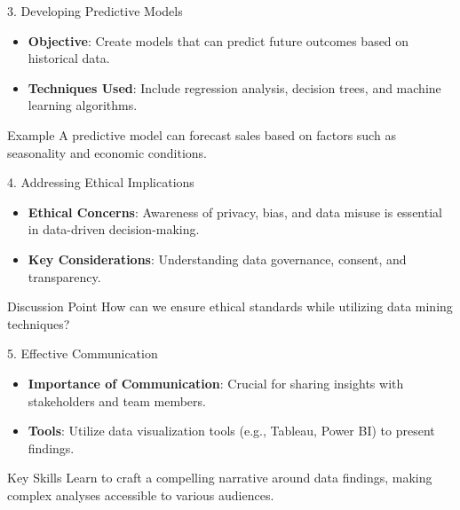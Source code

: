 \documentclass[aspectratio=169]{beamer}
\begin{document}
\begin{frame}[fragile]{3. Developing Predictive Models}
    \begin{itemize}
        \item \textbf{Objective}: Create models that can predict future outcomes based on historical data.
        \item \textbf{Techniques Used}: Include regression analysis, decision trees, and machine learning algorithms.
    \end{itemize}
    
    \begin{block}{Example}
        A predictive model can forecast sales based on factors such as seasonality and economic conditions.
    \end{block}
\end{frame}

\begin{frame}[fragile]{4. Addressing Ethical Implications}
    \begin{itemize}
        \item \textbf{Ethical Concerns}: Awareness of privacy, bias, and data misuse is essential in data-driven decision-making.
        \item \textbf{Key Considerations}: Understanding data governance, consent, and transparency.
    \end{itemize}
    
    \begin{block}{Discussion Point}
        How can we ensure ethical standards while utilizing data mining techniques?
    \end{block}
\end{frame}

\begin{frame}[fragile]{5. Effective Communication}
    \begin{itemize}
        \item \textbf{Importance of Communication}: Crucial for sharing insights with stakeholders and team members.
        \item \textbf{Tools}: Utilize data visualization tools (e.g., Tableau, Power BI) to present findings.
    \end{itemize}
    
    \begin{block}{Key Skills}
        Learn to craft a compelling narrative around data findings, making complex analyses accessible to various audiences.
    \end{block}
\end{frame}
\end{document}
